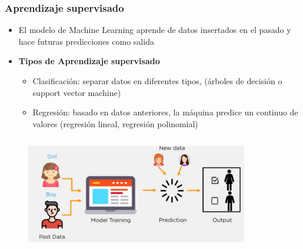 \documentclass[10pt]{beamer}
\begin{document}
\begin{frame}
\frametitle{Aprendizaje supervisado}
\begin{beamerboxesrounded}[upper=uppercolor, lower=lowercolor, shadow=true]{} 

\begin{itemize}
 \item El modelo de Machine Learning aprende de datos insertados en el pasado y hace futuras predicciones como salida
 \item \textbf{Tipos de Aprendizaje supervisado} 
 \begin{itemize}
   \item Clasificaci\'on: separar datos en diferentes tipos, (\'arboles de decisi\'on o support vector machine)
   \item Regresi\'on: basado en datos anteriores, la m\'aquina predice un continuo de valores (regresi\'on lineal, regresi\'on polinomial)
 \end{itemize}
  
\end{itemize}
\end{beamerboxesrounded}

\begin{columns}

\hspace{5mm}
\hspace{5mm}
\begin{column}{\textwidth}
 \begin{figure}
 \includegraphics[scale=0.2]{./Figures/clasificacion.png} 
 \end{figure}
\end{column}%

\begin{column}{.33\textwidth}
 \begin{figure}
 \end{figure}  
\end{column}%

\end{columns}

\end{frame}
\end{document}
